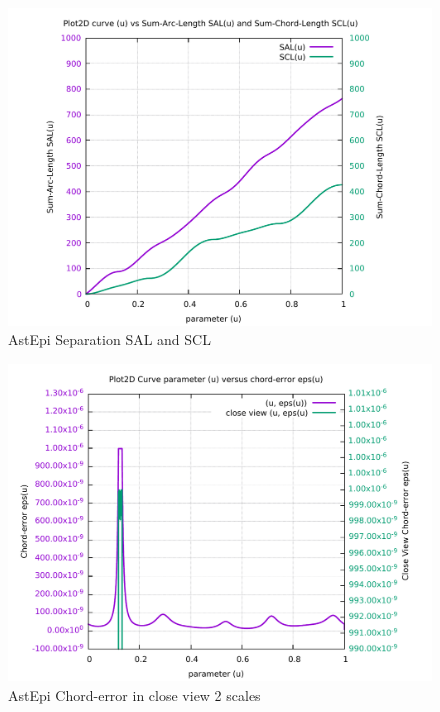 \begin{figure}
	\caption     {AstEpi Separation SAL and SCL}
	\label{08-img-AstEpi-Separation-SAL-and-SCL.pdf}
\includegraphics[width=1.00\textwidth]{Chap4/appendix/app-AstEpi/plots/08-img-AstEpi-Separation-SAL-and-SCL.pdf}
\end{figure}

\clearpage
\pagebreak

\begin{figure}
	\caption     {AstEpi Chord-error in close view 2 scales}
	\label{09-img-AstEpi-Chord-error-in-close-view-2-scales.pdf}
\includegraphics[width=1.00\textwidth]{Chap4/appendix/app-AstEpi/plots/09-img-AstEpi-Chord-error-in-close-view-2-scales.pdf}
\end{figure}

